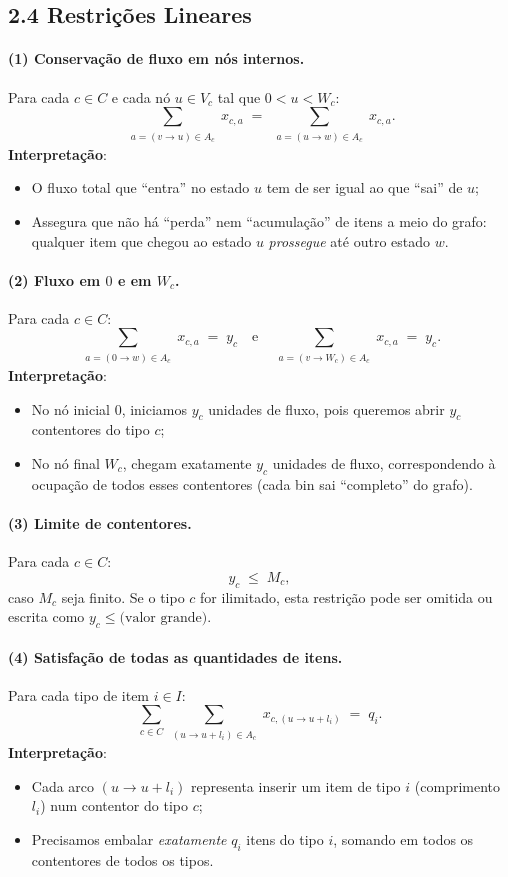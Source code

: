 \documentclass[a4paper,12pt]{article}
\begin{document}
\subsection*{2.4 Restrições Lineares}

\paragraph{(1) Conservação de fluxo em nós internos.}
Para cada $c \in C$ e cada nó $u \in V_c$ tal que $0 < u < W_c$:
\[
\sum_{\substack{a=(v\to u) \in A_c}} x_{c,a}
\;=\;
\sum_{\substack{a=(u\to w) \in A_c}} x_{c,a}.
\]
\noindent
\textbf{Interpretação}:
\begin{itemize}
  \item O fluxo total que “entra” no estado $u$ tem de ser igual ao que “sai” de $u$;
  \item Assegura que não há “perda” nem “acumulação” de itens a meio do grafo: qualquer item que chegou ao estado $u$ \emph{prossegue} até outro estado $w$.
\end{itemize}

\paragraph{(2) Fluxo em $0$ e em $W_c$.}
Para cada $c \in C$:
\[
\sum_{\substack{a=(0 \to w)\in A_c}} x_{c,a} \;=\; y_c
\quad\text{e}\quad
\sum_{\substack{a=(v \to W_c)\in A_c}} x_{c,a} \;=\; y_c.
\]
\noindent
\textbf{Interpretação}:
\begin{itemize}
  \item No nó inicial $0$, iniciamos $y_c$ unidades de fluxo, pois queremos abrir $y_c$ contentores do tipo $c$;
  \item No nó final $W_c$, chegam exatamente $y_c$ unidades de fluxo, correspondendo à ocupação de todos esses contentores (cada bin sai “completo” do grafo).
\end{itemize}

\paragraph{(3) Limite de contentores.}
Para cada $c \in C$:
\[
y_c \;\le\; M_c,
\]
caso $M_c$ seja finito. Se o tipo $c$ for ilimitado, esta restrição pode ser omitida ou escrita como $y_c \le \text{(valor grande)}$.

\paragraph{(4) Satisfação de todas as quantidades de itens.}
Para cada tipo de item $i \in I$:
\[
\sum_{c \in C}\sum_{\substack{(u\to u + l_i) \in A_c}} x_{c,(u\to u+l_i)} 
\;=\;
q_i.
\]
\noindent
\textbf{Interpretação}:
\begin{itemize}
  \item Cada arco $(u\to u + l_i)$ representa inserir um item de tipo $i$ (comprimento $l_i$) num contentor do tipo $c$;
  \item Precisamos embalar \emph{exatamente} $q_i$ itens do tipo $i$, somando em todos os contentores de todos os tipos.
\end{itemize}
\end{document}
